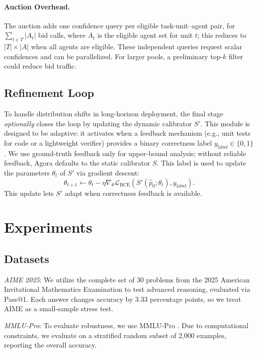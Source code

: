 \documentclass[11pt]{article}
\begin{document}
\paragraph{Auction Overhead.}
The auction adds one confidence query per eligible task-unit--agent pair, for $\sum_{t\in T}|A_t|$ bid calls, where $A_t$ is the eligible agent set for unit $t$; this reduces to $|T|\times|A|$ when all agents are eligible.
These independent queries request scalar confidences and can be parallelized. For larger pools, a preliminary top-$k$ filter could reduce bid traffic.


\subsection{Refinement Loop}
To handle distribution shifts in long-horizon deployment, the final stage \emph{optionally} closes the loop by updating the dynamic calibrator $S'$. 
This module is designed to be adaptive: it activates when a feedback mechanism (e.g., unit tests for code or a lightweight verifier) provides a binary correctness label $y_{\text{label}} \in \{0, 1\}$.
We use ground-truth feedback only for upper-bound analysis; without reliable feedback, Agora defaults to the static calibrator $S$.
This label is used to update the parameters $\theta_t$ of $S'$ via gradient descent:
\begin{equation}
\theta_{t+1} \leftarrow \theta_t - \eta \nabla_{\theta} \mathcal{L}_{\text{BCE}}(S'(\hat{p}_0; \theta_t), y_{\text{label}}).
\end{equation}
This update lets $S'$ adapt when correctness feedback is available.



\section{Experiments}
\label{sec:experiments}
\subsection{Datasets}
\noindent\emph{AIME 2025}: We utilize the complete set of 30 problems from the 2025 American Invitational Mathematics Examination to test advanced reasoning, evaluated via Pass@1. Each answer changes accuracy by 3.33 percentage points, so we treat AIME as a small-sample stress test.

\noindent\emph{MMLU-Pro}: To evaluate robustness, we use MMLU-Pro \citep{wang2024mmluprorobustchallengingmultitask}. Due to computational constraints, we evaluate on a stratified random subset of 2,000 examples, reporting the overall accuracy.
\end{document}
